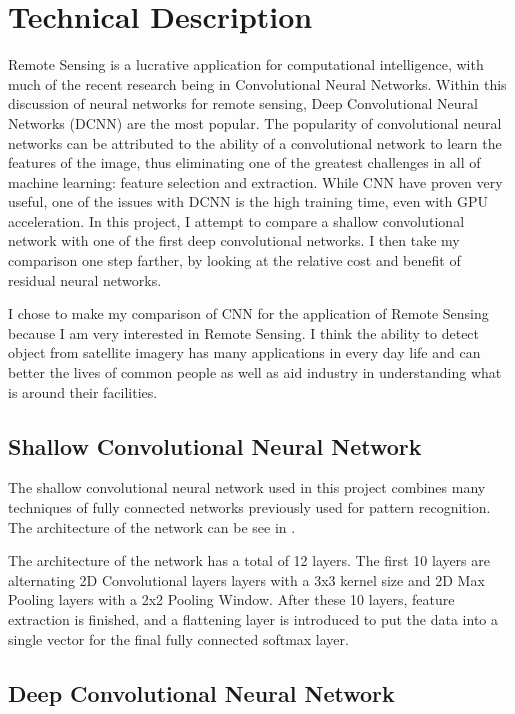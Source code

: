 \documentclass[12pt]{article}
\begin{document}
	\section{Technical Description}
	
Remote Sensing is a lucrative application for computational intelligence, with much of the recent research being in Convolutional Neural Networks. Within this discussion of neural networks for remote sensing, Deep Convolutional Neural Networks (DCNN) are the most popular. The popularity of convolutional neural networks can be attributed to the ability of a convolutional network to learn the features of the image, thus eliminating one of the greatest challenges in all of machine learning: feature selection and extraction. While CNN have proven very useful, one of the issues with DCNN is the high training time, even with GPU acceleration. In this project, I attempt to compare a shallow convolutional network with one of the first deep convolutional networks. I then take my comparison one step farther, by looking at the relative cost and benefit of residual neural networks. 
		
I chose to make my comparison of CNN for the application of Remote Sensing because I am very interested in Remote Sensing. I think the ability to detect object from satellite imagery has many applications in every day life and can better the lives of common people as well as aid industry in understanding what is around their facilities. 
		
		\subsection{Shallow Convolutional Neural Network}
		
The shallow convolutional neural network used in this project combines many techniques of fully connected networks previously used for pattern recognition. The architecture of the network can be see in .
		
The architecture of the network has a total of 12 layers. The first 10 layers are alternating 2D Convolutional layers layers with a 3x3 kernel size and 2D Max Pooling layers with a 2x2 Pooling Window. After these 10 layers, feature extraction is finished, and a flattening layer is introduced to put the data into a single vector for the final fully connected softmax layer. 
		
		
		\subsection{Deep Convolutional Neural Network}
		
\end{document}
